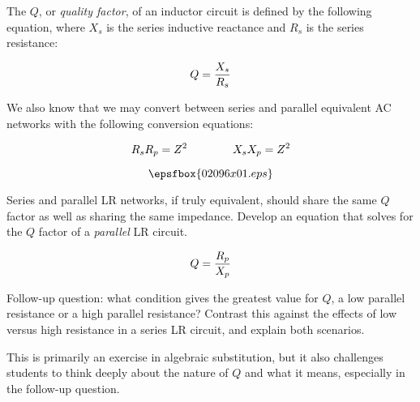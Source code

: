 

The $Q$, or {\it quality factor}, of an inductor circuit is defined by the following equation, where $X_s$ is the series inductive reactance and $R_s$ is the series resistance:

$$Q = {X_s \over R_{s}}$$

We also know that we may convert between series and parallel equivalent AC networks with the following conversion equations:

$$R_{s} R_{p} = Z^2 \hbox{\hskip 40pt} X_{s} X_{p} = Z^2$$

$$\epsfbox{02096x01.eps}$$

Series and parallel LR networks, if truly equivalent, should share the same $Q$ factor as well as sharing the same impedance.  Develop an equation that solves for the $Q$ factor of a {\it parallel} LR circuit.







$$Q = {R_p \over X_p}$$

\vskip 10pt

Follow-up question: what condition gives the greatest value for $Q$, a low parallel resistance or a high parallel resistance?  Contrast this against the effects of low versus high resistance in a series LR circuit, and explain both scenarios.







This is primarily an exercise in algebraic substitution, but it also challenges students to think deeply about the nature of $Q$ and what it means, especially in the follow-up question.




